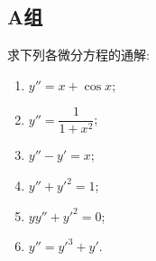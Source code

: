 \documentclass[lang=cn,11pt]{elegantbook}
\begin{document}
\subsection{A组}

\begin{exercise}[求通解]
求下列各微分方程的通解:
\begin{enumerate}
    \item[(1)] $y'' = x + \cos x$;
    \item[(2)] $y'' = \dfrac{1}{1+x^2}$;
    \item[(3)] $y'' - y' = x$;
    \item[(4)] $y'' + y'^2 = 1$;
    \item[(5)] $yy'' + y'^2 = 0$;
    \item[(6)] $y'' = y'^3 + y'$.
\end{enumerate}
\end{exercise}
\end{document}
